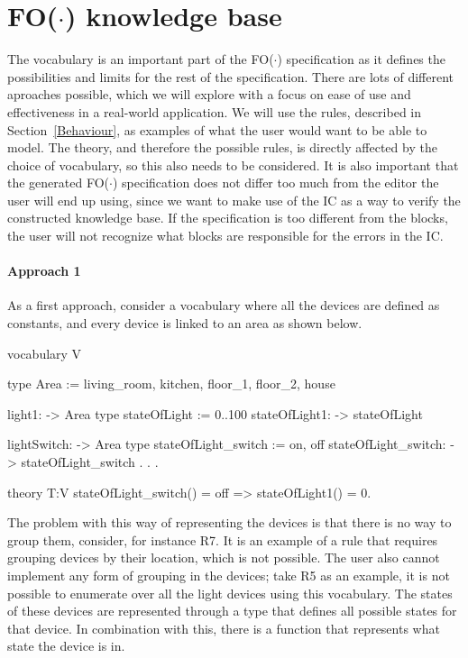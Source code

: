 \documentclass[11pt,a4paper]{report}
\newcommand{\fodot}{FO($\cdot$)\xspace}
\begin{document}
\section{\fodot knowledge base} 
\label{fodot_knowledge_base} 
The vocabulary is an important part of the \fodot specification as it defines the possibilities and limits for the rest of the specification. There are lots of different aproaches possible, which we will explore with a focus on ease of use and effectiveness in a real-world application. We will use the rules, described in Section~\ref{Behaviour}, as examples of what the user would want to be able to model. The theory, and therefore the possible rules, is directly affected by the choice of vocabulary, so this also needs to be considered. It is also important that the generated \fodot specification does not differ too much from the editor the user will end up using, since we want to make use of the IC as a way to verify the constructed knowledge base. If the specification is too different from the blocks, the user will not recognize what blocks are responsible for the errors in the IC.

\paragraph{Approach 1}
As a first approach, consider a vocabulary where all the devices are defined as constants, and every device is linked to an area as shown below.

\begin{idplisting}
vocabulary V {
    type Area := {living_room, kitchen, floor_1, floor_2, house}

    light1: -> Area
    type stateOfLight := {0..100}
    stateOfLight1: -> stateOfLight

    lightSwitch: -> Area
    type stateOfLight_switch := {on, off}
    stateOfLight_switch: -> stateOfLight_switch
    .
    .
    .
}

theory T:V {
    stateOfLight_switch() = off => stateOfLight1() = 0.
}
\end{idplisting}

The problem with this way of representing the devices is that there is no way to group them, consider, for instance R7. It is an example of a rule that requires grouping devices by their location, which is not possible. The user also cannot implement any form of grouping in the devices; take R5 as an example, it is not possible to enumerate over all the light devices using this vocabulary. The states of these devices are represented through a type that defines all possible states for that device. In combination with this, there is a function that represents what state the device is in.
\end{document}
